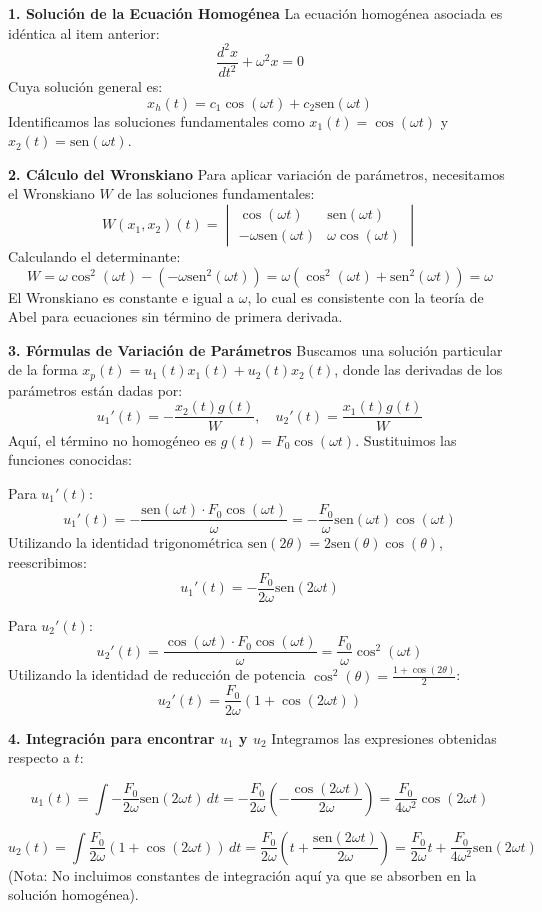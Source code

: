 \documentclass[a4paper]{article}
\begin{document}
\textbf{1. Solución de la Ecuación Homogénea}
La ecuación homogénea asociada es idéntica al item anterior:
$$
\frac{d^2 x}{dt^2} + \omega^2 x = 0
$$
Cuya solución general es:
$$
x_h(t) = c_1 \cos(\omega t) + c_2 \text{sen}(\omega t)
$$
Identificamos las soluciones fundamentales como $x_1(t) = \cos(\omega t)$ y $x_2(t) = \text{sen}(\omega t)$.

\textbf{2. Cálculo del Wronskiano}
Para aplicar variación de parámetros, necesitamos el Wronskiano $W$ de las soluciones fundamentales:
$$
W(x_1, x_2)(t) = \begin{vmatrix} \cos(\omega t) & \text{sen}(\omega t) \\ -\omega \text{sen}(\omega t) & \omega \cos(\omega t) \end{vmatrix}
$$
Calculando el determinante:
$$
W = \omega \cos^2(\omega t) - (-\omega \text{sen}^2(\omega t)) = \omega (\cos^2(\omega t) + \text{sen}^2(\omega t)) = \omega
$$
El Wronskiano es constante e igual a $\omega$, lo cual es consistente con la teoría de Abel para ecuaciones sin término de primera derivada.

\textbf{3. Fórmulas de Variación de Parámetros}
Buscamos una solución particular de la forma $x_p(t) = u_1(t) x_1(t) + u_2(t) x_2(t)$, donde las derivadas de los parámetros están dadas por:
$$
u_1'(t) = -\frac{x_2(t) g(t)}{W}, \quad u_2'(t) = \frac{x_1(t) g(t)}{W}
$$
Aquí, el término no homogéneo es $g(t) = F_0 \cos(\omega t)$. Sustituimos las funciones conocidas:

Para $u_1'(t)$:
$$
u_1'(t) = -\frac{\text{sen}(\omega t) \cdot F_0 \cos(\omega t)}{\omega} = -\frac{F_0}{\omega} \text{sen}(\omega t) \cos(\omega t)
$$
Utilizando la identidad trigonométrica $\text{sen}(2\theta) = 2 \text{sen}(\theta) \cos(\theta)$, reescribimos:
$$
u_1'(t) = -\frac{F_0}{2\omega} \text{sen}(2\omega t)
$$

Para $u_2'(t)$:
$$
u_2'(t) = \frac{\cos(\omega t) \cdot F_0 \cos(\omega t)}{\omega} = \frac{F_0}{\omega} \cos^2(\omega t)
$$
Utilizando la identidad de reducción de potencia $\cos^2(\theta) = \frac{1 + \cos(2\theta)}{2}$:
$$
u_2'(t) = \frac{F_0}{2\omega} (1 + \cos(2\omega t))
$$

\textbf{4. Integración para encontrar $u_1$ y $u_2$}
Integramos las expresiones obtenidas respecto a $t$:

$$
u_1(t) = \int -\frac{F_0}{2\omega} \text{sen}(2\omega t) \, dt = -\frac{F_0}{2\omega} \left( -\frac{\cos(2\omega t)}{2\omega} \right) = \frac{F_0}{4\omega^2} \cos(2\omega t)
$$

$$
u_2(t) = \int \frac{F_0}{2\omega} (1 + \cos(2\omega t)) \, dt = \frac{F_0}{2\omega} \left( t + \frac{\text{sen}(2\omega t)}{2\omega} \right) = \frac{F_0}{2\omega} t + \frac{F_0}{4\omega^2} \text{sen}(2\omega t)
$$
(Nota: No incluimos constantes de integración aquí ya que se absorben en la solución homogénea).
\end{document}

